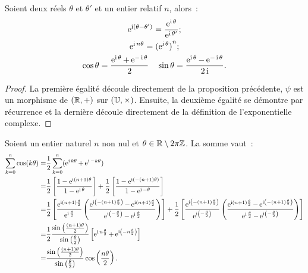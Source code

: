 \begin{prop}
  Soient deux réels \(\theta\) et \(\theta'\) et un entier relatif \(n\),
  alors~:
  \begin{gather}
    \operatorname{e}^{\operatorname{i} (\theta-\theta')} = \frac{\operatorname{e}^{\operatorname{i} \theta}}{\operatorname{e}^{\operatorname{i} \theta'}};\\
    \operatorname{e}^{\operatorname{i} n \theta} = {(\operatorname{e}^{\operatorname{i} \theta})}^n;\\
    \cos \theta = \frac{\operatorname{e}^{\operatorname{i}{}\theta} + \operatorname{e}^{-\operatorname{i}\theta}}{2} \quad \sin
    \theta = \frac{\operatorname{e}^{\operatorname{i}{}\theta}-\operatorname{e}^{-\operatorname{i}\theta}}{2\operatorname{i}}.
  \end{gather}
\end{prop}

\begin{proof}
  La première égalité découle directement de la proposition précédente,
  \(\psi\) est un morphisme de \((\mathbb{R}, + )\) sur \((\mathbb{U},\times)\). Ensuite, la
  deuxième égalité se démontre par récurrence et la dernière découle
  directement de la définition de l'exponentielle complexe.
\end{proof}

Soient un entier naturel \(n\) non nul et \(\theta \in{}\mathbb{R} \setminus 2\pi\mathbb{Z}\). La
somme vaut~:
\begin{align*}
  \sum_{k = 0}^n \cos(k\theta)  = & \frac{1}{2} \sum_{k = 0}^n (\operatorname{e}^{\operatorname{i} k
  \theta} + \operatorname{e}^{\operatorname{i} -k \theta})\\
    = &\frac{1}{2} \left[\frac{1-\operatorname{e}^{\operatorname{i} (n +
    1) \theta}}{1-\operatorname{e}^{\operatorname{i} \theta}} \right] + \frac{1}{2}
    \left[ \frac{1-\operatorname{e}^{\operatorname{i} (-(n + 1)\theta)}}{1-\operatorname{e}^{\operatorname{i} -\theta}} \right]\\
    = &\frac{1}{2} \left[ \frac{\operatorname{e}^{\operatorname{i} (n + 1)
    \frac{\theta}{2}}}{\operatorname{e}^{\operatorname{i} \frac{\theta}{2}}} \left( \frac{\operatorname{e}^{\operatorname{i} \left(
    -(n + 1) \frac{\theta}{2} \right)} - \operatorname{e}^{\operatorname{i} (n + 1)
    \frac{\theta}{2}}}{\operatorname{e}^{\operatorname{i} \left( -\frac{\theta}{2} \right)} -
    \operatorname{e}^{\operatorname{i} \frac{\theta}{2}}} \right) \right] \notag + \frac{1}{2} \left[
    \frac{\operatorname{e}^{\operatorname{i} \left( -(n + 1) \frac{\theta}{2} \right)}}{\operatorname{e}^{\operatorname{i} \left(
    -\frac{\theta}{2} \right)}} \left( \frac{\operatorname{e}^{\operatorname{i} (n + 1)
    \frac{\theta}{2}}-\operatorname{e}^{\operatorname{i} \left( -(n + 1) \frac{\theta}{2}
    \right)}}{\operatorname{e}^{\operatorname{i} \frac{\theta}{2}} - \operatorname{e}^{\operatorname{i} \left( -\frac{\theta}{2}
    \right)}} \right) \right] \\
    = & \frac{1}{2} \frac{\sin \left( \frac{(n + 1)\theta}{2} \right)}{\sin
    \left( \frac{\theta}{2} \right)} \left[ \operatorname{e}^{\operatorname{i} n \frac{\theta}{2}} +
    \operatorname{e}^{\operatorname{i} \left( -n \frac{\theta}{2} \right)} \right] \\
    = & \frac{\sin \left( \frac{(n + 1)\theta}{2} \right)}{\sin \left(
    \frac{\theta}{2} \right)} \cos \left( \frac{n\theta}{2} \right).
\end{align*}

